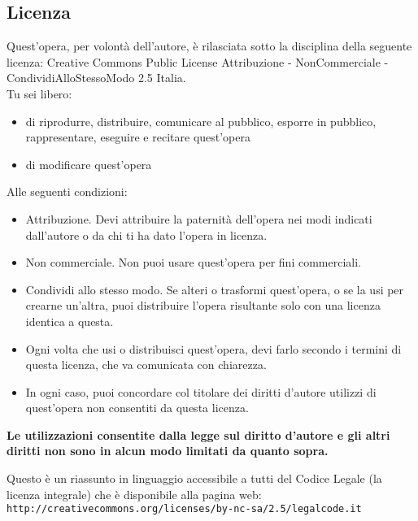 
\subsection*{Licenza} \label{lic}
Quest'opera, per volontà dell'autore, è rilasciata sotto la disciplina della seguente licenza: Creative Commons Public License Attribuzione - NonCommerciale - CondividiAlloStessoModo 2.5 Italia.\\
Tu sei libero: 
\begin{itemize}
\item  di riprodurre, distribuire, comunicare al pubblico, esporre in pubblico, rappresentare, eseguire e recitare quest'opera
\item di modificare quest'opera

\end{itemize}
Alle seguenti condizioni:
   \begin{itemize}
\item Attribuzione. Devi attribuire la paternità dell'opera nei modi indicati dall'autore o da chi ti ha dato l'opera in licenza. 	
\item Non commerciale. Non puoi usare quest'opera per fini commerciali.
\item Condividi allo stesso modo. Se alteri o trasformi quest'opera, o se la usi per crearne un'altra, puoi distribuire l'opera risultante solo con una licenza identica a questa.
\item Ogni volta che usi o distribuisci quest'opera, devi farlo secondo i termini di questa licenza, che va comunicata con chiarezza.
\item In ogni caso, puoi concordare col titolare dei diritti d'autore utilizzi di quest'opera non consentiti da questa licenza.

\end{itemize}

\textbf{Le utilizzazioni consentite dalla legge sul diritto d'autore e gli altri diritti non sono in alcun modo limitati da quanto sopra.}

Questo è un riassunto in linguaggio accessibile a tutti del Codice Legale (la licenza integrale) che è disponibile alla pagina web:\\
\verb|http://creativecommons.org/licenses/by-nc-sa/2.5/legalcode.it|
